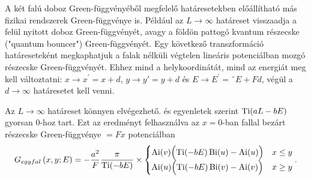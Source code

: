 A két falú doboz Green-függvényéből megfelelő határesetekben előállítható más fizikai rendszerek Green-függvénye is. Például az $L\to\infty$ határeset visszaadja a felül nyitott doboz Green-függvényét, avagy a földön pattogó kvantum részecske ("quantum bouncer") Green-függvényét. Egy következő transzformáció határeseteként megkaphatjuk a falak nélküli végtelen lineáris potenciálban mozgó részecske Green-függvényét. Ehhez mind a helykoordinátát, mind az energiát meg kell változtatni: $x\to x^\prime=x+d$, $y\to y\prime=y+d$ és $E\to E^\prime=ˇE+Fd$, végül a $d\to\infty$ határesetet kell venni.

Az $L\to\infty$ határeset könnyen elvégezhető.  és  egyenletek szerint $\operatorname{Ti}(aL-bE)$ gyorsan $0$-hoz tart. Ezt az eredményt felhasználva az $x=0$-ban fallal bezárt részecske Green-függvénye $=Fx$ potenciálban
\begin{equation}
	G_{egy fal}\left(x,y;E\right) = -\frac{a^2}{F}\frac{\pi}{\operatorname{Ti}(-bE)}\times
	\begin{cases}
		\operatorname{Ai}(v)\Bigl(\operatorname{Ti}(-bE)\operatorname{Bi}(u)-\operatorname{Ai}(u)\Bigr)& x \leq y\\
		\operatorname{Ai}(u)\Bigl(\operatorname{Ti}(-bE)\operatorname{Bi}(v)-\operatorname{Ai}(v)\Bigr)& x \geq y
	\end{cases}.
	\label{limits:semiinfinite}
\end{equation}

